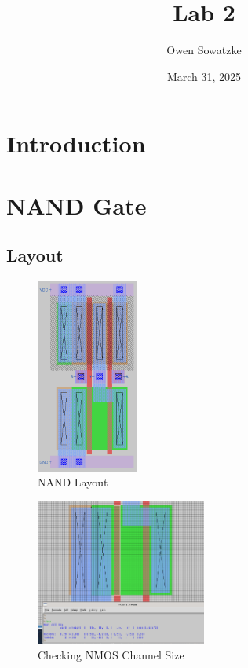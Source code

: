 \documentclass{article}
\title{Lab 2}
\author{Owen Sowatzke}
\date{March 31, 2025}
\newcommand{\zerodisplayskip}{
	\setlength{\abovedisplayskip}{0pt}%
	\setlength{\belowdisplayskip}{0pt}%
	\setlength{\abovedisplayshortskip}{0pt}%
	\setlength{\belowdisplayshortskip}{0pt}%
	\setlength{\mathindent}{0pt}}
\begin{document}
	\maketitle
	
	\section{Introduction}
	
	\section{NAND Gate}
	
	\subsection{Layout}
	
	\begin{figure}[H]
		\centerline{\includegraphics[width=0.3\textwidth]{nand_layout.png}}
		\caption{NAND Layout}
		\label{fig::nand_layout}
	\end{figure}

	\begin{figure}[H]
		\centerline{\includegraphics[width=0.5\textwidth]{nand_nmos_channel_sizing.png}}
		\caption{Checking NMOS Channel Size}
		\label{fig::nand_nmos_channel_sizing}
	\end{figure}
	
\end{document}
